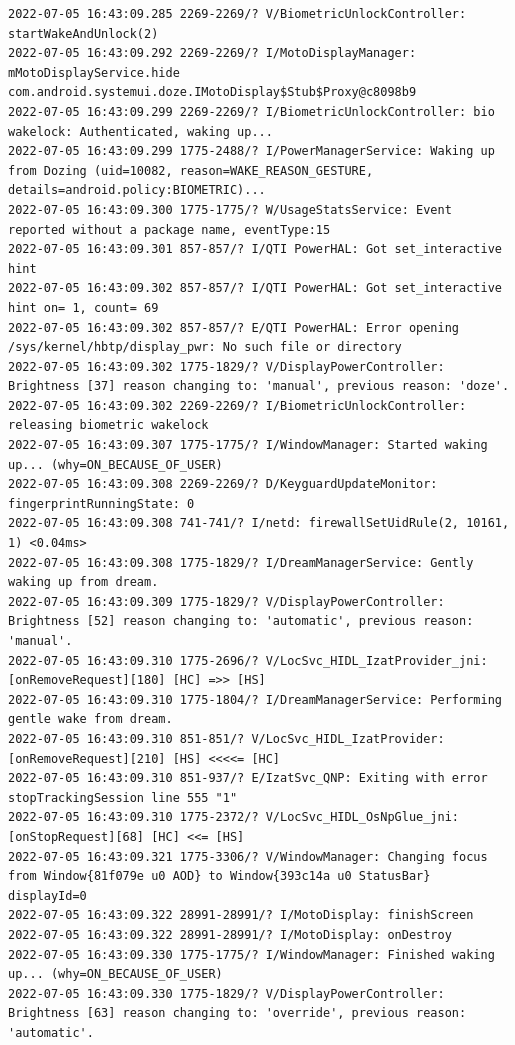 \documentclass[a4paper,12pt]{book}
\begin{document}
\begin{lstlisting}
2022-07-05 16:43:09.285 2269-2269/? V/BiometricUnlockController: startWakeAndUnlock(2)
2022-07-05 16:43:09.292 2269-2269/? I/MotoDisplayManager: mMotoDisplayService.hide com.android.systemui.doze.IMotoDisplay$Stub$Proxy@c8098b9
2022-07-05 16:43:09.299 2269-2269/? I/BiometricUnlockController: bio wakelock: Authenticated, waking up...
2022-07-05 16:43:09.299 1775-2488/? I/PowerManagerService: Waking up from Dozing (uid=10082, reason=WAKE_REASON_GESTURE, details=android.policy:BIOMETRIC)...
2022-07-05 16:43:09.300 1775-1775/? W/UsageStatsService: Event reported without a package name, eventType:15
2022-07-05 16:43:09.301 857-857/? I/QTI PowerHAL: Got set_interactive hint
2022-07-05 16:43:09.302 857-857/? I/QTI PowerHAL: Got set_interactive hint on= 1, count= 69
2022-07-05 16:43:09.302 857-857/? E/QTI PowerHAL: Error opening /sys/kernel/hbtp/display_pwr: No such file or directory
2022-07-05 16:43:09.302 1775-1829/? V/DisplayPowerController: Brightness [37] reason changing to: 'manual', previous reason: 'doze'.
2022-07-05 16:43:09.302 2269-2269/? I/BiometricUnlockController: releasing biometric wakelock
2022-07-05 16:43:09.307 1775-1775/? I/WindowManager: Started waking up... (why=ON_BECAUSE_OF_USER)
2022-07-05 16:43:09.308 2269-2269/? D/KeyguardUpdateMonitor: fingerprintRunningState: 0
2022-07-05 16:43:09.308 741-741/? I/netd: firewallSetUidRule(2, 10161, 1) <0.04ms>
2022-07-05 16:43:09.308 1775-1829/? I/DreamManagerService: Gently waking up from dream.
2022-07-05 16:43:09.309 1775-1829/? V/DisplayPowerController: Brightness [52] reason changing to: 'automatic', previous reason: 'manual'.
2022-07-05 16:43:09.310 1775-2696/? V/LocSvc_HIDL_IzatProvider_jni: [onRemoveRequest][180] [HC] =>> [HS]
2022-07-05 16:43:09.310 1775-1804/? I/DreamManagerService: Performing gentle wake from dream.
2022-07-05 16:43:09.310 851-851/? V/LocSvc_HIDL_IzatProvider: [onRemoveRequest][210] [HS] <<<<= [HC]
2022-07-05 16:43:09.310 851-937/? E/IzatSvc_QNP: Exiting with error stopTrackingSession line 555 "1"
2022-07-05 16:43:09.310 1775-2372/? V/LocSvc_HIDL_OsNpGlue_jni: [onStopRequest][68] [HC] <<= [HS]
2022-07-05 16:43:09.321 1775-3306/? V/WindowManager: Changing focus from Window{81f079e u0 AOD} to Window{393c14a u0 StatusBar} displayId=0
2022-07-05 16:43:09.322 28991-28991/? I/MotoDisplay: finishScreen
2022-07-05 16:43:09.322 28991-28991/? I/MotoDisplay: onDestroy
2022-07-05 16:43:09.330 1775-1775/? I/WindowManager: Finished waking up... (why=ON_BECAUSE_OF_USER)
2022-07-05 16:43:09.330 1775-1829/? V/DisplayPowerController: Brightness [63] reason changing to: 'override', previous reason: 'automatic'.

\end{lstlisting}
\end{document}
